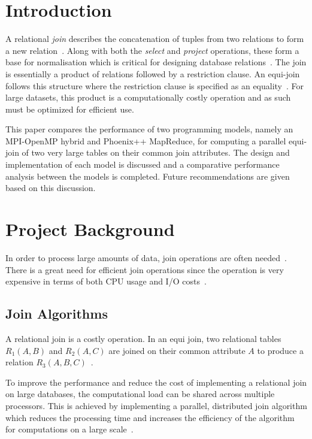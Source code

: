 \documentclass[10pt,twocolumn]{witseiepaper}
\begin{document}
\section{Introduction}

A relational \textit{join} describes the concatenation of tuples from two relations to form a new relation~\cite{stanczyk2001theory}. Along with both the \textit{select} and \textit{project} operations, these form a base for normalisation which is critical for designing database relations~\cite{stanczyk2001theory}. The join is essentially a product of relations followed by a restriction clause. An equi-join follows this structure where the restriction clause is specified as an equality~\cite{stanczyk2001theory}. For large datasets, this product is a computationally costly operation and as such must be optimized for efficient use.

This paper compares the performance of two programming models, namely an MPI-OpenMP hybrid and Phoenix++ MapReduce, for computing a parallel equi-join of two very large tables on their common join attributes. The design and implementation of each model is discussed and a comparative performance analysis between the models is completed. Future recommendations are given based on this discussion.

\section{Project Background}
In order to process large amounts of data, join operations are often needed~\cite{mapReduceJoin}. There is a great need for efficient join operations since the operation is very expensive in terms of both CPU usage and I/O costs~\cite{mapReduceJoin}.

\subsection{Join Algorithms}

A relational join is a costly operation. In an equi join, two relational tables $R_1(A,B)$ and $R_2(A,C)$ are joined on their common attribute $A$ to produce a relation $R_3(A,B,C)$~\cite{thomas_zurek_optimisation_1997}.

To improve the performance and reduce the cost of implementing a relational join on large databases, the computational load can be shared across multiple processors. This is achieved by implementing a parallel, distributed join algorithm which reduces the processing time and increases the efficiency of the algorithm for computations on a large scale~\cite{thomas_zurek_optimisation_1997}.
\end{document}
